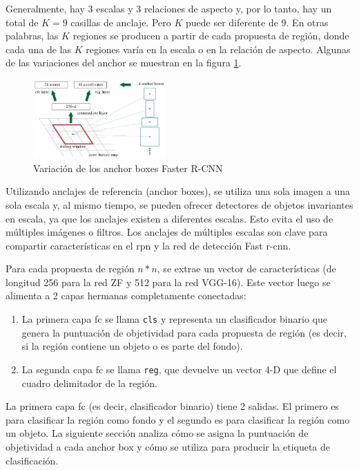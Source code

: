 Generalmente, hay 3 escalas y 3 relaciones de aspecto y, por lo tanto, hay un total de $K = 9$ casillas de anclaje. Pero $K$ puede ser diferente de 9. En otras palabras, las $K$ regiones se producen a partir de cada propuesta de región, donde cada una de las $K$ regiones varía en la escala o en la relación de aspecto. Algunas de las variaciones del anchor se muestran en la figura \ref{fig:variacion-anchor-boxes-faster-rcnn}.

\begin{figure}[ht]
\centering
\includegraphics[width=0.45\textwidth]{img/chapters/estado-del-arte/variacion-anchor-boxes-faster-rcnn.jpg}
\caption{\label{fig:variacion-anchor-boxes-faster-rcnn}Variación de los anchor boxes Faster R-CNN \cite{ren2016faster}}
\end{figure}

Utilizando anclajes de referencia (anchor boxes), se utiliza una sola imagen a una sola escala y, al mismo tiempo, se pueden ofrecer detectores de objetos invariantes en escala, ya que los anclajes existen a diferentes escalas. Esto evita el uso de múltiples imágenes o filtros. Los anclajes de múltiples escalas son clave para compartir características en el \gls{rpn} y la red de detección Fast \gls{r-cnn}.

Para cada propuesta de región $n*n$, se extrae un vector de características (de longitud 256 para la red ZF y 512 para la red VGG-16). Este vector luego se alimenta a 2 capas hermanas completamente conectadas:

\begin{enumerate}
    \item La primera capa \gls{fc} se llama \texttt{cls} y representa un clasificador binario que genera la puntuación de objetividad para cada propuesta de región (es decir, si la región contiene un objeto o es parte del fondo).
    \item La segunda capa \gls{fc} se llama \texttt{reg}, que devuelve un vector 4-D que define el cuadro delimitador de la región.
\end{enumerate}

La primera capa \gls{fc} (es decir, clasificador binario) tiene 2 salidas. El primero es para clasificar la región como fondo y el segundo es para clasificar la región como un objeto. La siguiente sección analiza cómo se asigna la puntuación de objetividad a cada anchor box y cómo se utiliza para producir la etiqueta de clasificación.

